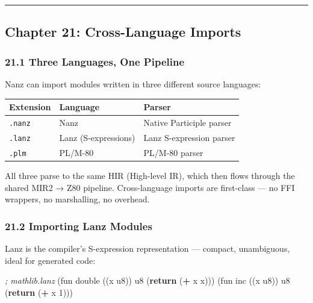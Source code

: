 \documentclass[
  11pt,
]{article}
\newenvironment{Shaded}{\begin{snugshade}}{\end{snugshade}}
\newcommand{\CommentTok}[1]{\textcolor[rgb]{0.56,0.35,0.01}{\textit{#1}}}
\newcommand{\DecValTok}[1]{\textcolor[rgb]{0.00,0.00,0.81}{#1}}
\newcommand{\KeywordTok}[1]{\textcolor[rgb]{0.13,0.29,0.53}{\textbf{#1}}}
\newcommand{\NormalTok}[1]{#1}
\newcommand{\OperatorTok}[1]{\textcolor[rgb]{0.81,0.36,0.00}{\textbf{#1}}}
\begin{document}
\begin{center}\rule{0.5\linewidth}{0.5pt}\end{center}

\hypertarget{chapter-21-cross-language-imports}{%
\subsection{Chapter 21: Cross-Language
Imports}\label{chapter-21-cross-language-imports}}

\hypertarget{three-languages-one-pipeline}{%
\subsubsection{21.1 Three Languages, One
Pipeline}\label{three-languages-one-pipeline}}

Nanz can import modules written in three different source languages:

\begin{longtable}[]{@{}lll@{}}
\toprule\noalign{}
Extension & Language & Parser \\
\midrule\noalign{}
\endhead
\bottomrule\noalign{}
\endlastfoot
\texttt{.nanz} & Nanz & Native Participle parser \\
\texttt{.lanz} & Lanz (S-expressions) & Lanz S-expression parser \\
\texttt{.plm} & PL/M-80 & PL/M-80 parser \\
\end{longtable}

All three parse to the same HIR (High-level IR), which then flows
through the shared MIR2 → Z80 pipeline. Cross-language imports are
first-class --- no FFI wrappers, no marshalling, no overhead.

\hypertarget{importing-lanz-modules}{%
\subsubsection{21.2 Importing Lanz
Modules}\label{importing-lanz-modules}}

Lanz is the compiler's S-expression representation --- compact,
unambiguous, ideal for generated code:

\begin{Shaded}
\begin{Highlighting}[]
\CommentTok{; mathlib.lanz}
\NormalTok{(fun double ((x u8)) u8 (}\KeywordTok{return}\NormalTok{ (}\OperatorTok{+}\NormalTok{ x x)))}
\NormalTok{(fun inc ((x u8)) u8 (}\KeywordTok{return}\NormalTok{ (}\OperatorTok{+}\NormalTok{ x }\DecValTok{1}\NormalTok{)))}
\end{Highlighting}
\end{Shaded}
\end{document}
